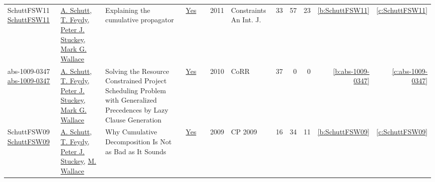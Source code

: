 {\begin{longtable}{>{\raggedright\arraybackslash}p{3cm}>{\raggedright\arraybackslash}p{6cm}>{\raggedright\arraybackslash}p{6.5cm}rrrp{2.5cm}rrrrr}
SchuttFSW11 \href{https://doi.org/10.1007/s10601-010-9103-2}{SchuttFSW11} & \hyperref[auth:a125]{A. Schutt}, \hyperref[auth:a155]{T. Feydy}, \hyperref[auth:a126]{Peter J. Stuckey}, \hyperref[auth:a156]{Mark G. Wallace} & Explaining the cumulative propagator & \href{works/SchuttFSW11.pdf}{Yes} & \cite{SchuttFSW11} & 2011 & Constraints An Int. J. & 33 & 57 & 23 & \ref{b:SchuttFSW11} & \ref{c:SchuttFSW11}\\
abs-1009-0347 \href{http://arxiv.org/abs/1009.0347}{abs-1009-0347} & \hyperref[auth:a125]{A. Schutt}, \hyperref[auth:a155]{T. Feydy}, \hyperref[auth:a126]{Peter J. Stuckey}, \hyperref[auth:a156]{Mark G. Wallace} & Solving the Resource Constrained Project Scheduling Problem with Generalized Precedences by Lazy Clause Generation & \href{works/abs-1009-0347.pdf}{Yes} & \cite{abs-1009-0347} & 2010 & CoRR & 37 & 0 & 0 & \ref{b:abs-1009-0347} & \ref{c:abs-1009-0347}\\
SchuttFSW09 \href{https://doi.org/10.1007/978-3-642-04244-7\_58}{SchuttFSW09} & \hyperref[auth:a125]{A. Schutt}, \hyperref[auth:a155]{T. Feydy}, \hyperref[auth:a126]{Peter J. Stuckey}, \hyperref[auth:a117]{M. Wallace} & Why Cumulative Decomposition Is Not as Bad as It Sounds & \href{works/SchuttFSW09.pdf}{Yes} & \cite{SchuttFSW09} & 2009 & CP 2009 & 16 & 34 & 11 & \ref{b:SchuttFSW09} & \ref{c:SchuttFSW09}\\
\end{longtable}
}


